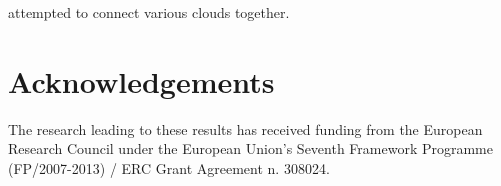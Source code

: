 \documentclass[fleqn,usenatbib]{mnras}
\begin{document}
\citet{Jo2012} attempted to connect various clouds together.

\section*{Acknowledgements}

The research leading to these results has received funding from the
European Research Council under the European Union's Seventh Framework
Programme (FP/2007-2013) / ERC Grant Agreement n. 308024.





\bsp	%
\label{lastpage}
\end{document}
